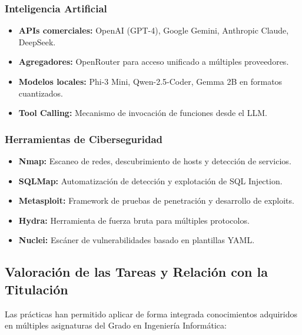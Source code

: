 \documentclass[12pt,a4paper]{article}
\begin{document}
\subsubsection{Inteligencia Artificial}

\begin{itemize}
    \item \textbf{APIs comerciales:} OpenAI (GPT-4), Google Gemini, Anthropic Claude, DeepSeek.
    \item \textbf{Agregadores:} OpenRouter para acceso unificado a múltiples proveedores.
    \item \textbf{Modelos locales:} Phi-3 Mini, Qwen-2.5-Coder, Gemma 2B en formatos cuantizados.
    \item \textbf{Tool Calling:} Mecanismo de invocación de funciones desde el LLM.
\end{itemize}

\subsubsection{Herramientas de Ciberseguridad}

\begin{itemize}
    \item \textbf{Nmap:} Escaneo de redes, descubrimiento de hosts y detección de servicios.
    \item \textbf{SQLMap:} Automatización de detección y explotación de SQL Injection.
    \item \textbf{Metasploit:} Framework de pruebas de penetración y desarrollo de exploits.
    \item \textbf{Hydra:} Herramienta de fuerza bruta para múltiples protocolos.
    \item \textbf{Nuclei:} Escáner de vulnerabilidades basado en plantillas YAML.
\end{itemize}

\newpage

\subsection{Valoración de las Tareas y Relación con la Titulación}

Las prácticas han permitido aplicar de forma integrada conocimientos adquiridos en múltiples asignaturas del Grado en Ingeniería Informática:
\end{document}
